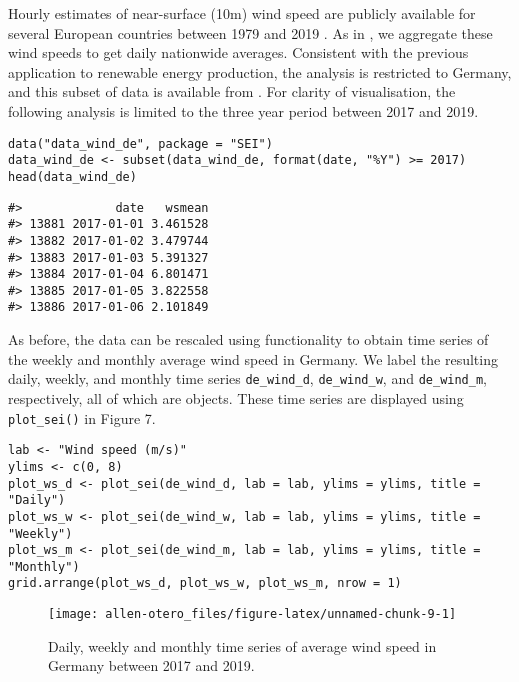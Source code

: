 Hourly estimates of near-surface (10m) wind speed are publicly available for several European countries between 1979 and 2019 \citep{HersbachEtAl2023}. As in \cite{OteroEtAl2022b}, we aggregate these wind speeds to get daily nationwide averages. Consistent with the previous application to renewable energy production, the analysis is restricted to Germany, and this subset of data is available from . For clarity of visualisation, the following analysis is limited to the three year period between 2017 and 2019.

\begin{verbatim}
data("data_wind_de", package = "SEI")
data_wind_de <- subset(data_wind_de, format(date, "%Y") >= 2017)
head(data_wind_de)
\end{verbatim}

\begin{verbatim}
#>             date   wsmean
#> 13881 2017-01-01 3.461528
#> 13882 2017-01-02 3.479744
#> 13883 2017-01-03 5.391327
#> 13884 2017-01-04 6.801471
#> 13885 2017-01-05 3.822558
#> 13886 2017-01-06 2.101849
\end{verbatim}

As before, the data can be rescaled using  functionality to obtain time series of the weekly and monthly average wind speed in Germany. We label the resulting daily, weekly, and monthly time series \texttt{de\_wind\_d}, \texttt{de\_wind\_w}, and \texttt{de\_wind\_m}, respectively, all of which are  objects. These time series are displayed using \texttt{plot\_sei()} in Figure 7.

\begin{verbatim}
lab <- "Wind speed (m/s)"
ylims <- c(0, 8)
plot_ws_d <- plot_sei(de_wind_d, lab = lab, ylims = ylims, title = "Daily")
plot_ws_w <- plot_sei(de_wind_w, lab = lab, ylims = ylims, title = "Weekly")
plot_ws_m <- plot_sei(de_wind_m, lab = lab, ylims = ylims, title = "Monthly")
grid.arrange(plot_ws_d, plot_ws_w, plot_ws_m, nrow = 1)
\end{verbatim}

\begin{figure}

{\centering \texttt{[image: allen-otero\_files/figure-latex/unnamed-chunk-9-1]} 

}

\caption{Daily, weekly and monthly time series of average wind speed in Germany between 2017 and 2019.}\label{fig:unnamed-chunk-9}
\end{figure}

